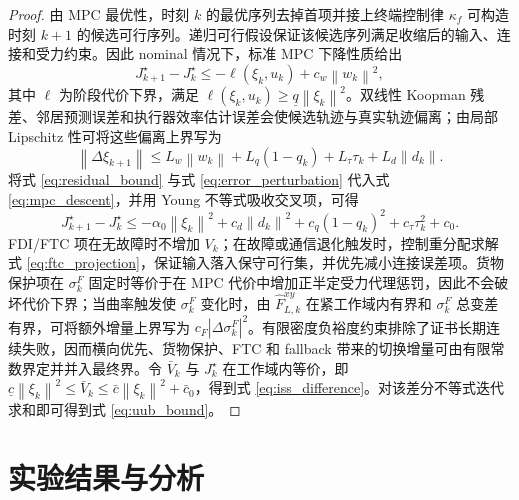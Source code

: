 \documentclass[twocolumn,3p,times,procedia]{elsarticle}
\newif\ifNRReview
\newcommand{\reviewblock}[1]{\ifNRReview\par\smallskip\noindent\begingroup\setlength{\fboxsep}{4pt}\colorbox{yellow!35}{\parbox{0.96\linewidth}{\footnotesize\textbf{当前不足：} #1}}\endgroup\par\smallskip\fi}
\newcommand{\norm}[1]{\left\lVert #1 \right\rVert}
\begin{document}
\begin{proof}
由 MPC 最优性，时刻 $k$ 的最优序列去掉首项并接上终端控制律 $\kappa_f$ 可构造时刻 $k+1$ 的候选可行序列。递归可行假设保证该候选序列满足收缩后的输入、连接和受力约束。因此 nominal 情况下，标准 MPC 下降性质给出
\begin{equation}
J_{k+1}^\star-J_k^\star\le -\ell(\xi_k,u_k)+c_w\norm{w_k}^2 ,
\label{eq:mpc_descent}
\end{equation}
其中 $\ell$ 为阶段代价下界，满足 $\ell(\xi_k,u_k)\ge \underline q\norm{\xi_k}^2$。双线性 Koopman 残差、邻居预测误差和执行器效率估计误差会使候选轨迹与真实轨迹偏离；由局部 Lipschitz 性可将这些偏离上界写为
\begin{equation}
\norm{\Delta \xi_{k+1}}\le L_w\norm{w_k}+L_q(1-q_k)+L_\tau\tau_k+L_d\norm{d_k}.
\label{eq:error_perturbation}
\end{equation}
将式 \eqref{eq:residual_bound} 与式 \eqref{eq:error_perturbation} 代入式 \eqref{eq:mpc_descent}，并用 Young 不等式吸收交叉项，可得
\begin{equation}
J_{k+1}^\star-J_k^\star\le -\alpha_0\norm{\xi_k}^2+c_d\norm{d_k}^2+c_q(1-q_k)^2+c_\tau\tau_k^2+c_0 .
\label{eq:descent_with_disturbance}
\end{equation}
FDI/FTC 项在无故障时不增加 $V_k$；在故障或通信退化触发时，控制重分配求解式 \eqref{eq:ftc_projection}，保证输入落入保守可行集，并优先减小连接误差项。货物保护项在 $\sigma_k^F$ 固定时等价于在 MPC 代价中增加正半定受力代理惩罚，因此不会破坏代价下界；当曲率触发使 $\sigma_k^F$ 变化时，由 $\hat F_{L,k}^{xy}$ 在紧工作域内有界和 $\sigma_k^F$ 总变差有界，可将额外增量上界写为 $c_F|\Delta\sigma_k^F|^2$。有限密度负裕度约束排除了证书长期连续失败，因而横向优先、货物保护、FTC 和 fallback 带来的切换增量可由有限常数界定并并入最终界。令 $\bar V_k$ 与 $J_k^\star$ 在工作域内等价，即 $\underline c\norm{\xi_k}^2\le \bar V_k\le \bar c\norm{\xi_k}^2+\bar c_0$，得到式 \eqref{eq:iss_difference}。对该差分不等式迭代求和即可得到式 \eqref{eq:uub_bound}。
\end{proof}

\reviewblock{本版证明已把货物保护切换器纳入增强证书函数，但仍依赖有界工作域、有限切换密度、受力代理有界和保护分支可行假设；实验11的证书统计只能作为证书裕度和 ok ratio 的闭环证据，不能替代理论证明，也不能推出所有场景全局渐近稳定。旧版全场景聚合统计中 nominal 和 single-fault 出现负最小裕度；本轮分模式压力场景证据显示 high-communication-noise 与 mixed fault/noise 中 nominal/FTC 模式均为正裕度。因此稳定性 claim 应限定为有界工作域内的 ISS/UUB 实践有界。}

\section{实验结果与分析}
\end{document}
